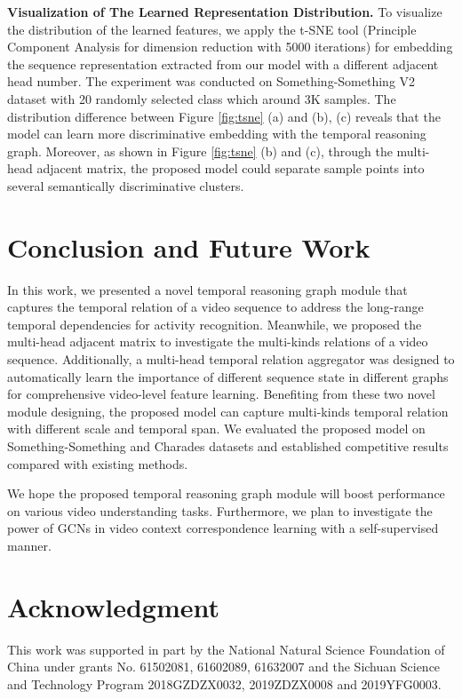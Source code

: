 \documentclass[conference,compsoc]{IEEEtran}
\begin{document}
    \noindent\textbf{Visualization of The Learned Representation Distribution.} To visualize the distribution of the learned features, we apply the t-SNE tool (Principle Component Analysis for dimension reduction with 5000 iterations) for embedding the sequence representation extracted from our model with a different adjacent head number. The experiment was conducted on Something-Something V2 dataset with 20 randomly selected class which around 3K samples. The distribution difference between Figure \ref{fig:tsne} (a) and (b), (c) reveals that the model can learn more discriminative embedding with the temporal reasoning graph. Moreover, as shown in Figure \ref{fig:tsne} (b) and (c), through the multi-head adjacent matrix, the proposed model could separate sample points into several semantically discriminative clusters.
    
\section{Conclusion and Future Work}
\label{sec:conclusion}
    In this work, we presented a novel temporal reasoning graph module that captures the temporal relation of a video sequence to address the long-range temporal dependencies for activity recognition. Meanwhile, we proposed the multi-head adjacent matrix to investigate the multi-kinds relations of a video sequence. Additionally, a multi-head temporal relation aggregator was designed to automatically learn the importance of different sequence state in different graphs for comprehensive video-level feature learning. Benefiting from these two novel module designing, the proposed model can capture multi-kinds temporal relation with different scale and temporal span. We evaluated the proposed model on Something-Something and Charades datasets and established competitive results compared with existing methods.
    
    We hope the proposed temporal reasoning graph module will boost performance on various video understanding tasks. Furthermore, we plan to investigate the power of GCNs in video context correspondence learning with a self-supervised manner.




\section*{Acknowledgment}
This work was supported in part by the National Natural Science Foundation of China under grants No. 61502081, 61602089, 61632007 and the Sichuan Science and Technology Program 2018GZDZX0032, 2019ZDZX0008 and 2019YFG0003.






















\end{document}
